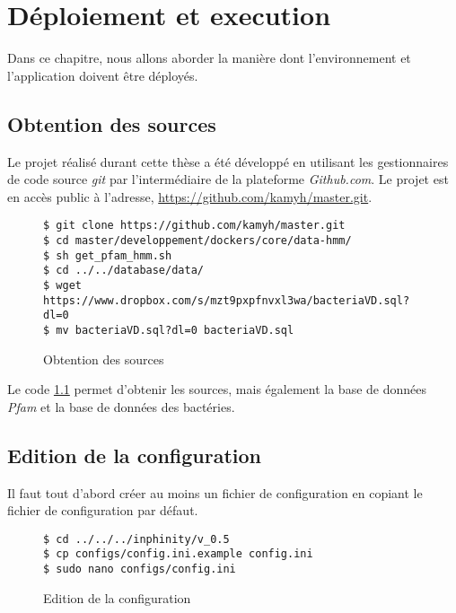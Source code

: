 \chapter{Déploiement et execution}
\label{ch:setup}

Dans ce chapitre, nous allons aborder la manière dont l'environnement et l'application doivent être déployés.

\section{Obtention des sources}

Le projet réalisé durant cette thèse a été développé en utilisant les gestionnaires de code source \emph{git} par l'intermédiaire de la plateforme \emph{Github.com}. Le projet est en accès public à l'adresse, \url{https://github.com/kamyh/master.git}.

\begin{figure}[H] 
\centering 
\begin{lstlisting}[frame=single]
$ git clone https://github.com/kamyh/master.git
$ cd master/developpement/dockers/core/data-hmm/
$ sh get_pfam_hmm.sh
$ cd ../../database/data/
$ wget https://www.dropbox.com/s/mzt9pxpfnvxl3wa/bacteriaVD.sql?dl=0
$ mv bacteriaVD.sql?dl=0 bacteriaVD.sql
\end{lstlisting} 
\caption[Code - Obtention de sources]{Obtention des sources}
\label{fig:getSources} 
\end{figure}

Le code \ref{fig:getSources} permet d'obtenir les sources, mais également la base de données \emph{Pfam} et la base de données des bactéries.

\section{Edition de la configuration}

Il faut tout d'abord créer au moins un fichier de configuration en copiant le fichier de configuration par défaut.

\begin{figure}[H] 
\centering 
\begin{lstlisting}[frame=single]
$ cd ../../../inphinity/v_0.5
$ cp configs/config.ini.example config.ini
$ sudo nano configs/config.ini
\end{lstlisting} 
\caption[Code - Edition de la configuration]{Edition de la configuration}
\label{fig:renameConfig} 
\end{figure}

